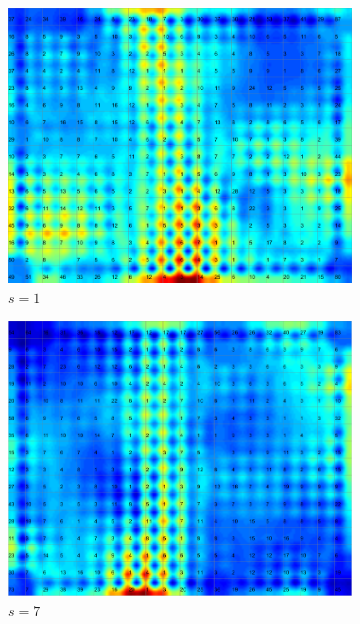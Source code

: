 \documentclass{acm_proc_article-sp}
\begin{document}
\begin{figure}
\centering
    \centering
    \begin{subfigure}[b]{0.30\linewidth}
        \includegraphics[width=\linewidth]{img/wine-newmid-u-matrix-seed-1}
        \caption{$s=1$}
    \end{subfigure}
    \begin{subfigure}[b]{0.30\linewidth}
        \includegraphics[width=\linewidth]{img/wine-newmid-u-matrix-seed-7}
        \caption{$s=7$}
    \end{subfigure}
    \begin{subfigure}[b]{0.30\linewidth}

\end{subfigure}
\end{figure}
\end{document}
